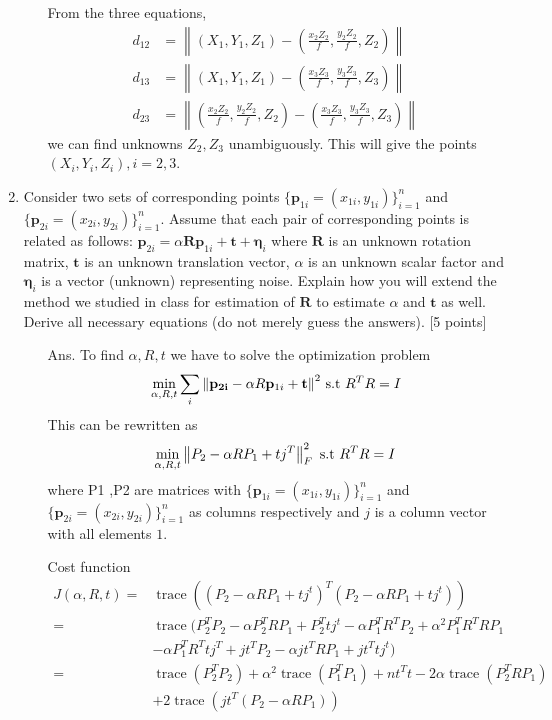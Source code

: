 \documentclass[11pt]{article}
\newcommand{\norm}[1]{\left\lVert#1\right\rVert}
\newcommand{\tr}{\operatorname{trace}}
\begin{document}
\begin{enumerate}
\begin{itemize}
	From the three equations,
	\begin{align}
		d_{12} &= \norm{(X_1,Y_1,Z_1) - \left (\frac{x_2Z_2}{f},\frac{y_2Z_2}{f},Z_2 \right )} \\
		d_{13} &= \norm{(X_1,Y_1,Z_1) - \left (\frac{x_3Z_3}{f},\frac{y_3Z_3}{f},Z_3 \right )} \\
		d_{23} &= \norm{ \left (\frac{x_2Z_2}{f},\frac{y_2Z_2}{f},Z_2 \right )  -  \left (\frac{x_3Z_3}{f},\frac{y_3Z_3}{f},Z_3 \right )}
	\end{align}
	we can find unknowns $Z_2, Z_3$ unambiguously. This will give the points $(X_i,Y_i,Z_i), i= 2,3$.
\end{itemize}


\item Consider two sets of corresponding points $\{\mathbf{p}_{1i} = (x_{1i},y_{1i})\}_{i=1}^{n}$ and $\{\mathbf{p}_{2i} = (x_{2i},y_{2i})\}_{i=1}^{n}$. Assume that each pair of corresponding points is related as follows: $\mathbf{p}_{2i} = \alpha \mathbf{R} \mathbf{p}_{1i} + \mathbf{t} + \mathbf{\eta}_i$ where $\mathbf{R}$ is an unknown rotation matrix, $\mathbf{t}$ is an unknown translation vector, $\alpha$ is an unknown scalar factor and $\mathbf{\eta}_i$ is a vector (unknown) representing noise. Explain how you will extend the method we studied in class for estimation of $\mathbf{R}$ to estimate $\alpha$ and $\mathbf{t}$ as well. Derive all necessary equations (do not merely guess the answers). \textsf{[5 points]}
\begin{itemize}
	\item[Ans.] To find $\alpha,R,t$ we have to solve the optimization problem 
	\[
		\min_{\alpha,R,t} \sum_i{\norm{\mathbf{{p}_{2i}} - \alpha R \mathbf{p}_{1i} + \mathbf{t}}}^2
		\textnormal{  s.t  } R^TR = I
	\]
	This can be rewritten as 
	\[
		\min_{\alpha,R,t} \norm{P_2 - \alpha R P_1 + tj^T}_F^2
		\textnormal{  s.t  } R^TR = I
	\] where P1 ,P2 are matrices with  $\{\mathbf{p}_{1i} = (x_{1i},y_{1i})\}_{i=1}^{n}$ and $\{\mathbf{p}_{2i} = (x_{2i},y_{2i})\}_{i=1}^{n}$ as columns respectively and $j$ is a column vector with all elements $1$.

	Cost function 
	\begin{align*}
	J(\alpha,R,t) =& \tr( (P_2 - \alpha R P_1 + tj^t)^T(P_2 - \alpha R P_1 + tj^t)  )\\
	=& \tr(P_2^TP_2 -\alpha P_2^T R P_1 + P_2^Ttj^t - \alpha P_1^TR^TP_2 + \alpha^2 P_1^TR^TRP_1 \\ 
	 &   - \alpha P_1^TR^T tj^T + jt^TP_2 - \alpha jt^T R P_1 + jt^Ttj^t)\\
	=& \tr(P_2^TP_2) + \alpha^2\tr(P_1^TP_1) + nt^Tt - 2 \alpha \tr(P_2^T R P_1 )\\
	 & + 2\tr(jt^T(P_2-\alpha R P_1))
	\end{align*}
	

\end{itemize}
\end{enumerate}
\end{document}
